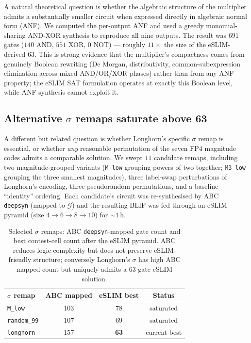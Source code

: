 \documentclass[11pt]{article}
\begin{document}
A natural theoretical question is whether the algebraic structure
of the multiplier admits a substantially smaller circuit when
expressed directly in algebraic normal form (ANF).
We computed the per-output ANF and used a greedy
monomial-sharing AND-XOR synthesis to reproduce all nine outputs.
The result was $691$ gates ($140$ AND, $551$ XOR, $0$ NOT) ---
roughly $11\times$ the size of the eSLIM-derived 63.
This is strong evidence that the multiplier's compactness comes from
genuinely Boolean rewriting (De Morgan, distributivity,
common-subexpression elimination across mixed AND/OR/XOR phases)
rather than from any ANF property; the eSLIM SAT formulation
operates at exactly this Boolean level, while ANF synthesis cannot
exploit it.

\subsection{Alternative $\sigma$ remaps saturate above 63}
\label{sec:sigma-sweep}

A different but related question is whether Longhorn's specific
$\sigma$ remap is essential, or whether \emph{any} reasonable
permutation of the seven FP4 magnitude codes admits a comparable
solution. We swept $11$ candidate remaps, including
two magnitude-grouped variants (\texttt{M\_low} grouping powers of
two together; \texttt{M3\_low} grouping the three smallest
magnitudes), three label-swap perturbations of Longhorn's encoding,
three pseudorandom permutations, and a baseline ``identity''
ordering. Each candidate's circuit was re-synthesised by
ABC~\cite{abc} \texttt{deepsyn} (mapped to
$\mathcal{G}$) and the resulting BLIF was fed through an
eSLIM pyramid (size $4 \to 6 \to 8 \to 10$) for $\sim$$1$\,h.

\begin{table}[h!]
  \centering
  \caption{Selected $\sigma$ remaps: ABC \texttt{deepsyn}-mapped
    gate count and best contest-cell count after the eSLIM pyramid.
    ABC reduces logic complexity but does not preserve
    eSLIM-friendly structure; conversely Longhorn's $\sigma$ has
    high ABC mapped count but uniquely admits a 63-gate eSLIM
    solution.}
  \label{tab:sigma}
  \begin{tabular}{lccc}
    \toprule
    $\sigma$ remap & ABC mapped & eSLIM best & Status \\
    \midrule
    \texttt{M\_low}        & 103 & 78 & saturated \\
    \texttt{random\_99}    & 107 & 69 & saturated \\
    \texttt{longhorn}      & 157 & \textbf{63} & current best \\
    \bottomrule
  \end{tabular}
\end{table}
\end{document}
